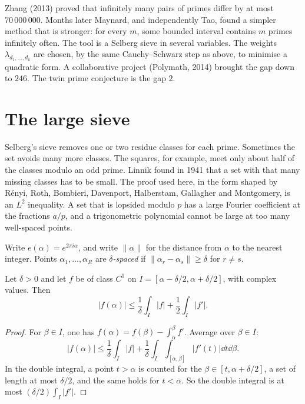 \begin{beauty}
Zhang (2013) proved that infinitely many pairs of primes differ by at most $70\,000\,000$. Months later Maynard, and independently Tao, found a simpler method that is stronger: for every $m$, some bounded interval contains $m$ primes infinitely often. The tool is a Selberg sieve in several variables. The weights $\lambda_{d_1,\dots,d_k}$ are chosen, by the same Cauchy--Schwarz step as above, to minimise a quadratic form. A collaborative project (Polymath, 2014) brought the gap down to $246$. The twin prime conjecture is the gap $2$.
\end{beauty}

\section{The large sieve}

Selberg's sieve removes one or two residue classes for each prime. Sometimes the set avoids many more classes. The squares, for example, meet only about half of the classes modulo an odd prime. Linnik found in 1941 that a set with that many missing classes has to be small. The proof used here, in the form shaped by R\'enyi, Roth, Bombieri, Davenport, Halberstam, Gallagher and Montgomery, is an $L^2$ inequality. A set that is lopsided modulo $p$ has a large Fourier coefficient at the fractions $a/p$, and a trigonometric polynomial cannot be large at too many well-spaced points.

Write $e(\alpha)=e^{2\pi i\alpha}$, and write $\|\alpha\|$ for the distance from $\alpha$ to the nearest integer. Points $\alpha_1,\dots,\alpha_R$ are \emph{$\delta$-spaced} if $\|\alpha_r-\alpha_s\|\ge\delta$ for $r\ne s$.

\begin{lemma}[Gallagher]\label{lem:gallagher}
Let $\delta>0$ and let $f$ be of class $C^1$ on $I=[\alpha-\delta/2,\alpha+\delta/2]$, with complex values. Then
\[
|f(\alpha)|\le\frac1\delta\int_I|f|+\frac12\int_I|f'|.
\]
\end{lemma}
\begin{proof}
For $\beta\in I$, one has $f(\alpha)=f(\beta)-\int_\alpha^\beta f'$. Average over $\beta\in I$:
\[
|f(\alpha)|\le\frac1\delta\int_I|f|+\frac1\delta\int_I\int_{[\alpha,\beta]}|f'(t)|\dd t\dd\beta.
\]
In the double integral, a point $t>\alpha$ is counted for the $\beta\in[t,\alpha+\delta/2]$, a set of length at most $\delta/2$, and the same holds for $t<\alpha$. So the double integral is at most $(\delta/2)\int_I|f'|$.
\end{proof}

